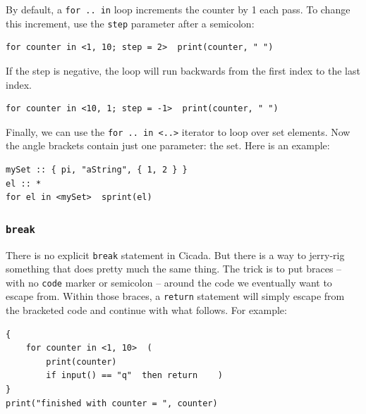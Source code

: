 \documentclass{article}
\newenvironment{code}{
       \begin{list}{}{
               \setlength{\leftmargin}{.4in}
               \setlength{\rightmargin}{0in}
               \setlength{\topsep}{.2in}
       }
       \small
       \item[] }
       { \end{list}   }
\begin{document}
By default, a \verb#for .. in# loop increments the counter by 1 each pass.  To change this increment, use the \verb#step# parameter after a semicolon:

\begin{code} \begin{verbatim}
for counter in <1, 10; step = 2>  print(counter, " ")
\end{verbatim} \end{code}

\noindent If the step is negative, the loop will run backwards from the first index to the last index.

\begin{code} \begin{verbatim}
for counter in <10, 1; step = -1>  print(counter, " ")
\end{verbatim} \end{code}

Finally, we can use the \verb#for .. in <..># iterator to loop over set elements.  Now the angle brackets contain just one parameter:  the set.  Here is an example:

\begin{code} \begin{verbatim}
mySet :: { pi, "aString", { 1, 2 } }
el :: *
for el in <mySet>  sprint(el)
\end{verbatim} \end{code}






\subsubsection{\texttt{break}} 

There is no explicit \verb#break# statement in Cicada.  But there is a way to jerry-rig something that does pretty much the same thing.  The trick is to put braces -- with no \verb#code# marker or semicolon -- around the code we eventually want to escape from.  Within those braces, a \verb#return# statement will simply escape from the bracketed code and continue with what follows.  For example:

\begin{code} \begin{verbatim}
{
    for counter in <1, 10>  (
        print(counter)
        if input() == "q"  then return    )
}
print("finished with counter = ", counter)
\end{verbatim} \end{code}
\end{document}

